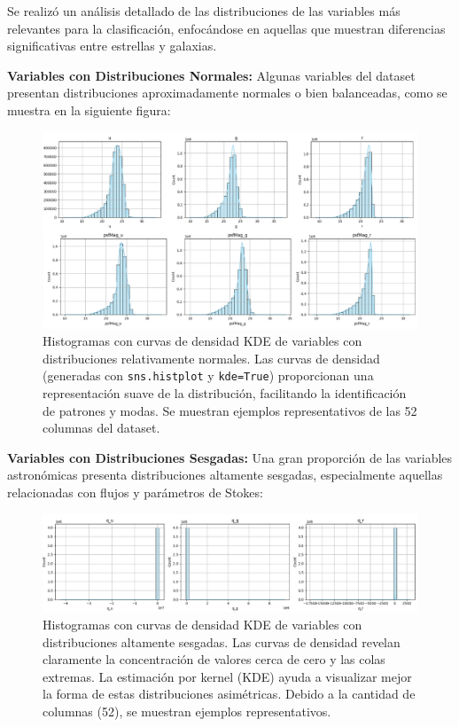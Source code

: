 \documentclass{article}
\begin{document}
Se realizó un análisis detallado de las distribuciones de las variables más relevantes para la clasificación, enfocándose en aquellas que muestran diferencias significativas entre estrellas y galaxias.

\textbf{Variables con Distribuciones Normales:}
Algunas variables del dataset presentan distribuciones aproximadamente normales o bien balanceadas, como se muestra en la siguiente figura:

\begin{figure}[H]
    \centering
    \includegraphics[width=1.0\linewidth]{variables_normales.png}
    \caption{Histogramas con curvas de densidad KDE de variables con distribuciones relativamente normales. Las curvas de densidad (generadas con \texttt{sns.histplot} y \texttt{kde=True}) proporcionan una representación suave de la distribución, facilitando la identificación de patrones y modas. Se muestran ejemplos representativos de las 52 columnas del dataset.}
    \label{fig:variables_normales}
\end{figure}

\textbf{Variables con Distribuciones Sesgadas:}
Una gran proporción de las variables astronómicas presenta distribuciones altamente sesgadas, especialmente aquellas relacionadas con flujos y parámetros de Stokes:

\begin{figure}[H]
    \centering
    \includegraphics[width=1.0\linewidth]{variables_sesgadas.png}
    \caption{Histogramas con curvas de densidad KDE de variables con distribuciones altamente sesgadas. Las curvas de densidad revelan claramente la concentración de valores cerca de cero y las colas extremas. La estimación por kernel (KDE) ayuda a visualizar mejor la forma de estas distribuciones asimétricas. Debido a la cantidad de columnas (52), se muestran ejemplos representativos.}
    \label{fig:variables_sesgadas}
\end{figure}
\end{document}
